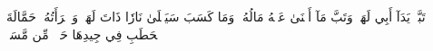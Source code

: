تَبَّتۡ يَدَآ أَبِي لَهَبٖ وَتَبَّ
مَآ أَغۡنَىٰ عَنۡهُ مَالُهُۥ وَمَا كَسَبَ
سَيَصۡلَىٰ نَارٗا ذَاتَ لَهَبٖ
وَٱمۡرَأَتُهُۥ حَمَّالَةَ ٱلۡحَطَبِ
فِي جِيدِهَا حَبۡلٞ مِّن مَّسَدِۭ